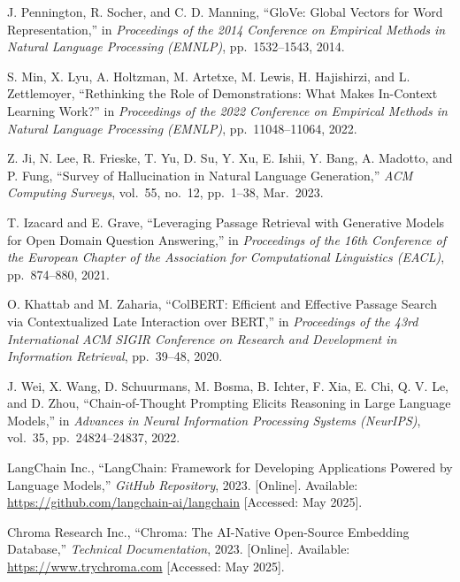 \begin{flushleft}
\noindent[15]\hspace{6pt}
J. Pennington, R. Socher, and C. D. Manning,
``GloVe: Global Vectors for Word Representation,''
in \textit{Proceedings of the 2014 Conference on Empirical Methods in Natural
Language Processing (EMNLP)}, pp.~1532--1543, 2014.

\noindent[16]\hspace{6pt}
S. Min, X. Lyu, A. Holtzman, M. Artetxe, M. Lewis, H. Hajishirzi, and
L. Zettlemoyer,
``Rethinking the Role of Demonstrations: What Makes In-Context Learning Work?''
in \textit{Proceedings of the 2022 Conference on Empirical Methods in Natural
Language Processing (EMNLP)}, pp.~11048--11064, 2022.

\noindent[17]\hspace{6pt}
Z. Ji, N. Lee, R. Frieske, T. Yu, D. Su, Y. Xu, E. Ishii, Y. Bang,
A. Madotto, and P. Fung,
``Survey of Hallucination in Natural Language Generation,''
\textit{ACM Computing Surveys},
vol.~55, no.~12, pp.~1--38, Mar.\ 2023.

\noindent[18]\hspace{6pt}
T. Izacard and E. Grave,
``Leveraging Passage Retrieval with Generative Models for Open Domain Question
Answering,''
in \textit{Proceedings of the 16th Conference of the European Chapter of the
Association for Computational Linguistics (EACL)},
pp.~874--880, 2021.

\noindent[19]\hspace{6pt}
O. Khattab and M. Zaharia,
``ColBERT: Efficient and Effective Passage Search via Contextualized Late
Interaction over BERT,''
in \textit{Proceedings of the 43rd International ACM SIGIR Conference on
Research and Development in Information Retrieval},
pp.~39--48, 2020.

\noindent[20]\hspace{6pt}
J. Wei, X. Wang, D. Schuurmans, M. Bosma, B. Ichter, F. Xia, E. Chi,
Q. V. Le, and D. Zhou,
``Chain-of-Thought Prompting Elicits Reasoning in Large Language Models,''
in \textit{Advances in Neural Information Processing Systems (NeurIPS)},
vol.~35, pp.~24824--24837, 2022.

\noindent[21]\hspace{6pt}
LangChain Inc.,
``LangChain: Framework for Developing Applications Powered by Language Models,''
\textit{GitHub Repository}, 2023. [Online]. Available:
\url{https://github.com/langchain-ai/langchain}
[Accessed: May 2025].

\noindent[22]\hspace{6pt}
Chroma Research Inc.,
``Chroma: The AI-Native Open-Source Embedding Database,''
\textit{Technical Documentation}, 2023. [Online]. Available:
\url{https://www.trychroma.com}
[Accessed: May 2025].


\end{flushleft}
